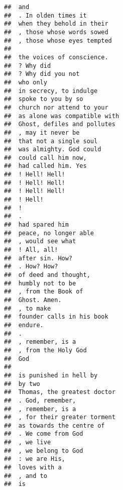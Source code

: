 \documentclass[]{article}
\begin{document}
\begin{verbatim}
##  and                                     
##  . In olden times it                     
##  when they behold in their               
##  , those whose words sowed               
##  , those whose eyes tempted              
##                                          
##  the voices of conscience.               
##  ? Why did                               
##  ? Why did you not                       
##  who only                                
##  in secrecy, to indulge                  
##  spoke to you by so                      
##  church nor attend to your               
##  as alone was compatible with            
##  Ghost, defiles and pollutes             
##  , may it never be                       
##  that not a single soul                  
##  was almighty. God could                 
##  could call him now,                     
##  had called him. Yes                     
##  ! Hell! Hell!                           
##  ! Hell! Hell!                           
##  ! Hell! Hell!                           
##  ! Hell!                                 
##  !                                       
##  .                                       
##  had spared him                          
##  peace, no longer able                   
##  , would see what                        
##  ! All, all!                             
##  after sin. How?                         
##  . How? How?                             
##  of deed and thought,                    
##  humbly not to be                        
##  , from the Book of                      
##  Ghost. Amen.                            
##  , to make                               
##  founder calls in his book               
##  endure.                                 
##  .                                       
##  , remember, is a                        
##  , from the Holy God                     
##  God                                     
##                                          
##  is punished in hell by                  
##  by two                                  
##  Thomas, the greatest doctor             
##  . God, remember,                        
##  , remember, is a                        
##  , for their greater torment             
##  as towards the centre of                
##  . We come from God                      
##  , we live                               
##  , we belong to God                      
##  : we are His,                           
##  loves with a                            
##  , and to                                
##  is                                      

\end{verbatim}
\end{document}
